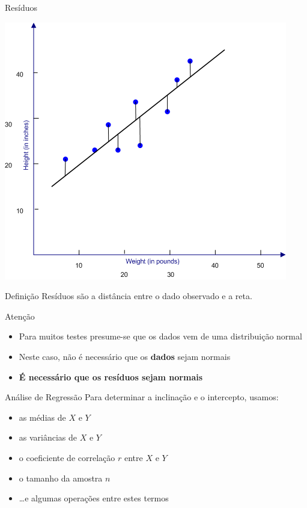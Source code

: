 \documentclass{beamer}
\begin{document}
\begin{frame}{Resíduos}
  \begin{center}
      \includegraphics[height=0.6\textheight]{Cap18-19/residuos}
  \end{center}

  \begin{block}{Definição}
    \small
    Resíduos são a distância entre o dado observado e a reta.
  \end{block}
\end{frame}

\begin{frame}{Atenção}
  \begin{itemize}
  \item Para muitos testes presume-se que os dados vem de uma distribuição normal
  \item Neste caso, não é necessário que os {\bf dados} sejam normais
  \item {\bf É necessário que os resíduos sejam normais}
  \end{itemize}
\end{frame}

\begin{frame}{Análise de Regressão}
  Para determinar a inclinação e o intercepto, usamos:
  \bigskip
  \begin{itemize}
    \scriptsize
  \item as médias de $X$ e $Y$
  \item as variâncias de $X$ e $Y$
  \item o coeficiente de correlação $r$ entre $X$ e $Y$
  \item o tamanho da amostra $n$
  \item \ldots e algumas operações entre estes termos
  \end{itemize}
\end{frame}
\end{document}
